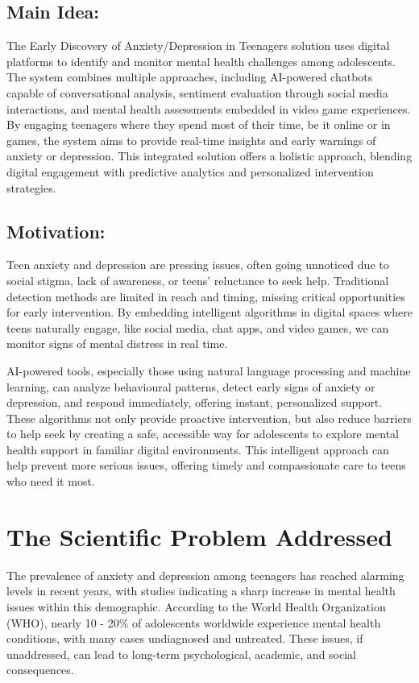 \documentclass[runningheads,a4paper,11pt]{report}
\begin{document}
\section{Main Idea:}
\label{section:idea}
The Early Discovery of Anxiety/Depression in Teenagers solution uses digital platforms to identify and monitor mental health challenges among adolescents. The system combines multiple approaches, including AI-powered chatbots capable of conversational analysis, sentiment evaluation through social media interactions, and mental health assessments embedded in video game experiences. By engaging teenagers where they spend most of their time, be it online or in games, the system aims to provide real-time insights and early warnings of anxiety or depression. This integrated solution offers a holistic approach, blending digital engagement with predictive analytics and personalized intervention strategies.

\section{Motivation:}
\label{section:motivation}
Teen anxiety and depression are pressing issues, often going unnoticed due to social stigma, lack of awareness, or teens' reluctance to seek help. Traditional detection methods are limited in reach and timing, missing critical opportunities for early intervention. By embedding intelligent algorithms in digital spaces where teens naturally engage, like social media, chat apps, and video games, we can monitor signs of mental distress in real time.

AI-powered tools, especially those using natural language processing and machine learning, can analyze behavioural patterns, detect early signs of anxiety or depression, and respond immediately, offering instant, personalized support. These algorithms not only provide proactive intervention, but also reduce barriers to help seek by creating a safe, accessible way for adolescents to explore mental health support in familiar digital environments. This intelligent approach can help prevent more serious issues, offering timely and compassionate care to teens who need it most.


\chapter{The Scientific Problem Addressed}
\label{chapter:scientific}

The prevalence of anxiety and depression among teenagers has reached alarming levels in recent years, with studies indicating a sharp increase in mental health issues within this demographic. According to the World Health Organization (WHO), nearly 10 - 20\% of adolescents worldwide experience mental health conditions, with many cases undiagnosed and untreated. These issues, if unaddressed, can lead to long-term psychological, academic, and social consequences.
\end{document}

